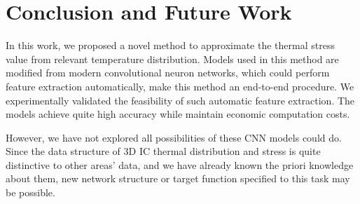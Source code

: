 
\chapter{Conclusion and Future Work} \label{chap::conc}
In this work, we proposed a novel method to approximate the thermal stress value
from relevant temperature distribution.
Models used in this method are modified from modern convolutional neuron networks,
which could perform feature extraction automatically, make this method an
end-to-end procedure.
We experimentally validated the feasibility of such automatic feature extraction.
The models achieve quite high accuracy while maintain economic computation costs.

However, we have not explored all possibilities of these CNN models could do.
Since the data structure of 3D IC thermal distribution and stress is quite distinctive
to other areas' data, and we have already known the priori knowledge about them,
new network structure or target function specified to this task may be possible.
